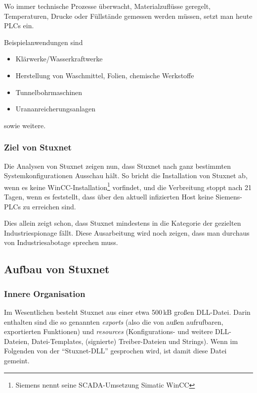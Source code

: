 Wo immer technische Prozesse überwacht, Materialzuflüsse geregelt,
Temperaturen, Drucke oder Füllstände gemessen werden müssen, setzt man
heute PLCs ein.

Beispielanwendungen sind

\begin{itemize}
  \item Klärwerke/Wasserkraftwerke
  \item Herstellung von Waschmittel, Folien, chemische Werkstoffe
  \item Tunnelbohrmaschinen
  \item Urananreicherungsanlagen
\end{itemize}

sowie weitere.

\subsubsection{Ziel von Stuxnet}

Die Analysen von Stuxnet zeigen nun, dass Stuxnet nach ganz bestimmten
Systemkonfigurationen Ausschau hält. So bricht die Installation von
Stuxnet ab, wenn es keine WinCC-Installation\footnote{Siemens nennt
seine SCADA-Umsetzung Simatic WinCC} vorfindet, und die Verbreitung
stoppt nach 21 Tagen, wenn es feststellt, dass über den aktuell
infizierten Host keine Siemens-PLCs zu erreichen sind.

Dies allein zeigt schon, dass Stuxnet mindestens in die Kategorie der
gezielten Industriespionage fällt. Diese Ausarbeitung wird noch
zeigen, dass man durchaus von Industriesabotage sprechen muss.

\subsection{Aufbau von Stuxnet}

\subsubsection{Innere Organisation}

Im Wesentlichen besteht Stuxnet aus einer etwa 500\,kB großen
DLL-Datei. Darin enthalten sind die so genannten \textit{exports}
(also die von außen aufrufbaren, exportierten Funktionen) und
\textit{resources} (Konfigurations- und weitere DLL-Dateien,
Datei-Templates, (signierte) Treiber-Dateien und Strings). Wenn im
Folgenden von der \enquote{Stuxnet-DLL} gesprochen wird, ist damit
diese Datei gemeint.

